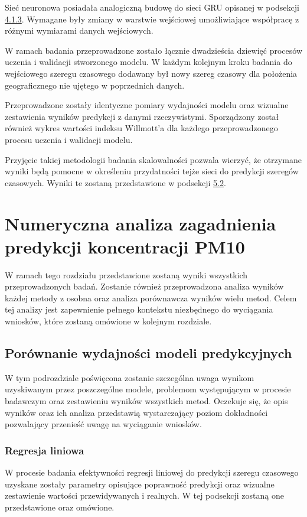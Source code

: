 \documentclass[10pt,a4paper]{article}
\begin{document}
Sieć neuronowa posiadała analogiczną budowę do sieci GRU opisanej w podsekcji \hyperlink{subsubsection.4.1.3}{4.1.3}. Wymagane były zmiany w warstwie wejściowej umożliwiające współpracę z różnymi wymiarami danych wejściowych.

W ramach badania przeprowadzone zostało łącznie dwadzieścia dziewięć procesów uczenia i walidacji stworzonego modelu. W każdym kolejnym kroku badania do wejściowego szeregu czasowego dodawany był nowy szereg czasowy dla położenia geograficznego nie ujętego w poprzednich danych. 

Przeprowadzone zostały identyczne pomiary wydajności modelu oraz wizualne zestawienia wyników predykcji z danymi rzeczywistymi. Sporządzony został również wykres wartości indeksu Willmott'a dla każdego przeprowadzonego procesu uczenia i walidacji modelu.

Przyjęcie takiej metodologii badania skalowalności pozwala wierzyć, że otrzymane wyniki będą pomocne w określeniu przydatności tejże sieci do predykcji szeregów czasowych. Wyniki te zostaną przedstawione w podsekcji \hyperlink{subsection.5.2}{5.2}.

\newpage
\section{Numeryczna analiza zagadnienia predykcji koncentracji PM10}
W ramach tego rozdziału przedstawione zostaną wyniki wszystkich przeprowadzonych badań. Zostanie również przeprowadzona analiza wyników każdej metody z osobna oraz analiza porównawcza wyników wielu metod. Celem tej analizy jest zapewnienie pełnego kontekstu niezbędnego do wyciągania wniosków, które zostaną omówione w kolejnym rozdziale. 

\subsection{Porównanie wydajności modeli predykcyjnych}
W tym podrozdziale poświęcona zostanie szczególna uwaga wynikom uzyskiwanym przez poszczególne modele, problemom występującym w procesie badawczym oraz zestawieniu wyników wszystkich metod. Oczekuje się, że opis wyników oraz ich analiza przedstawią wystarczający poziom dokładności pozwalający przenieść uwagę na wyciąganie wniosków.
 
\subsubsection{Regresja liniowa}
W procesie badania efektywności regresji liniowej do predykcji szeregu czasowego uzyskane zostały parametry opisujące poprawność predykcji oraz wizualne zestawienie wartości przewidywanych i realnych. W tej podsekcji zostaną one przedstawione oraz omówione. 
\end{document}
